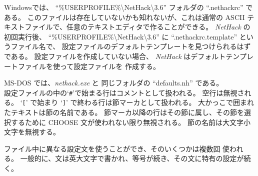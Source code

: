 Windowsでは、
\mbox{{``\%USERPROFILE\%\textbackslash NetHack\textbackslash 3.6''}} フォルダの
\mbox{``.nethackrc''} である。
このファイルは存在していないかも知れないが、これは通常の
ASCII テキストファイルで、任意のテキストエディタで作ることができる。
{\it NetHack\/} の初回実行後、
\mbox{{``\%USERPROFILE\%\textbackslash NetHack\textbackslash 3.6''}} に
\mbox{``.nethackrc.template''} というファイル名で、
設定ファイルのデフォルトテンプレートを見つけられるはずである。
設定ファイルを作成していない場合、
{\it NetHack\/} はデフォルトテンプレートファイルを使って設定ファイルを
作成する。

MS-DOS では、\mbox{{\it nethack.exe\/}} と
同じフォルダの \mbox{``defaults.nh''} である。\\

設定ファイルの中の`{\tt \#}'で始まる行はコメントとして扱われる。
空行は無視される。
`{\tt [}' で始まり `{\tt ]}' で終わる行は節マーカとして扱われる。
大かっこで囲まれたテキストは節の名前である。
節マーカ以降の行はその節に属し、その節を選択するために
CHOOSE 文が使われない限り無視される。
節の名前は大文字小文字を無視する。

ファイル中に異なる設定文を使うことができ、そのいくつかは複数回
使われる。
一般的に、文は英大文字で書かれ、等号が続き、その文に特有の設定が続く。


